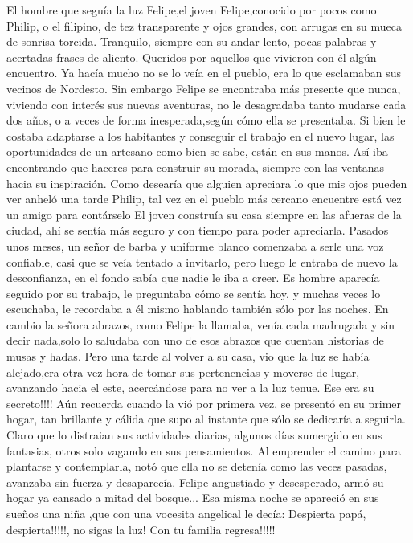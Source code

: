 \documentclass[12pt, a4paper, twoside]{book} %
\begin{document}
El hombre que seguía la luz
Felipe,el joven Felipe,conocido por pocos como Philip, o el filipino, de tez transparente y ojos grandes, con arrugas en su mueca de sonrisa torcida.
Tranquilo, siempre con su andar lento, pocas palabras y acertadas frases de aliento.
Queridos por aquellos que vivieron con él algún encuentro.
Ya hacía mucho no se lo veía en el pueblo, era lo que esclamaban sus vecinos de Nordesto.
Sin embargo Felipe se encontraba más presente que nunca, viviendo con interés sus nuevas aventuras, no le desagradaba tanto mudarse cada dos años, o a veces de forma inesperada,según cómo ella se presentaba.
Si bien le costaba adaptarse a los habitantes y conseguir el trabajo en el nuevo lugar, las oportunidades de un artesano como bien se sabe, están en sus manos.
Así iba encontrando que haceres para construir su morada, siempre con las ventanas hacia su inspiración.
Como desearía que alguien apreciara lo que mis ojos pueden ver anheló una tarde Philip, tal vez en el pueblo más cercano encuentre está vez un amigo para contárselo
El joven construía su casa siempre en las afueras de la ciudad, ahí se sentía más seguro y con tiempo para poder apreciarla.
Pasados unos meses, un señor de barba y uniforme blanco comenzaba a serle una voz confiable, casi que se veía tentado a invitarlo, pero luego le entraba de nuevo la desconfianza, en el fondo sabía que nadie le iba a creer.
Es hombre aparecía seguido por su trabajo, le preguntaba cómo se sentía hoy, y muchas veces lo escuchaba, le recordaba a él mismo hablando también sólo por las noches.
En cambio la señora abrazos, como Felipe la llamaba, venía cada madrugada y sin decir nada,solo lo saludaba con uno de esos abrazos que cuentan historias de musas y hadas.
Pero una tarde al volver a su casa, vio que la luz  se había alejado,era otra vez hora de tomar sus pertenencias y moverse de lugar, avanzando hacia el este, acercándose para no ver a la luz tenue.
Ese era su secreto!!!! Aún recuerda cuando la vió por primera vez, se presentó en su primer hogar, tan brillante y cálida que supo al instante que sólo se dedicaría a seguirla.
Claro que lo distraian sus actividades diarias, algunos días sumergido en sus fantasias, otros solo vagando en sus pensamientos.
Al emprender el camino para plantarse y contemplarla, notó que ella no se detenía como las veces pasadas, avanzaba sin fuerza y desaparecía.
Felipe angustiado y desesperado, armó su hogar ya cansado a mitad del bosque...
Esa misma  noche se apareció en sus sueños una niña ,que con una vocesita angelical le decía:
Despierta papá, despierta!!!!!, no sigas la luz!
Con tu familia regresa!!!!!
\end{document}
